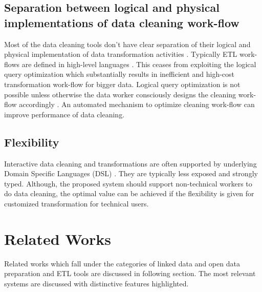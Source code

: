 \subsection{Separation between logical and physical implementations of data cleaning work-flow}
\noindent Most of the data cleaning tools don't have clear separation of their logical and physical implementation of data transformation activities \cite{declarativedatacleaning}\cite{Wisteria}. Typically ETL work-flows are defined in high-level languages \cite{ETL}. This ceases from exploiting the logical query optimization which substantially results in inefficient and high-cost transformation work-flow for bigger data.  Logical query optimization is not possible unless otherwise the data worker consciously designs the cleaning work-flow accordingly \cite{ETL}. An automated mechanism to optimize cleaning work-flow can improve performance of data cleaning. 
\subsection{Flexibility}
\noindent Interactive data cleaning and transformations are often supported by underlying Domain Specific Languages (DSL) \cite{Wisteria}. They are typically less exposed and strongly typed. Although, the proposed system should support non-technical workers to do data cleaning, the optimal value can be achieved if the flexibility is given for customized transformation for technical users. 
\section{Related Works}
\label{sec:relatedwork}
Related works which fall under the categories of linked data and open data preparation and ETL tools are discussed in following section. The most relevant systems are discussed with distinctive features highlighted.
